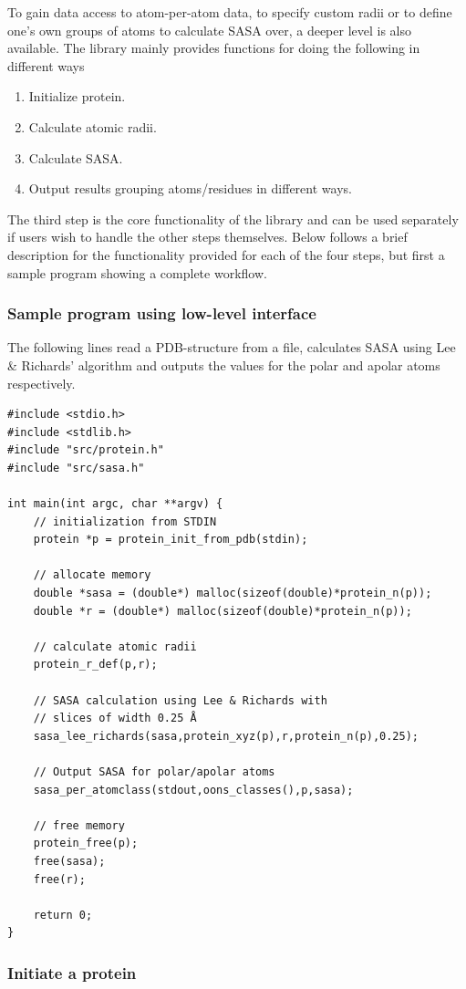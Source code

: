 \documentclass[a4paper,11pt]{article}
\begin{document}
To gain data access to atom-per-atom data, to specify custom radii or
to define one's own groups of atoms to calculate SASA over, a deeper
level is also available. The library mainly provides functions for
doing the following in different ways
\begin{enumerate}
  \item Initialize protein.
  \item Calculate atomic radii.
  \item Calculate SASA.
  \item Output results grouping atoms/residues in different ways.
\end{enumerate}
The third step is the core functionality of the library and can be
used separately if users wish to handle the other steps
themselves. Below follows a brief description for the functionality
provided for each of the four steps, but first a sample program
showing a complete workflow.

\subsubsection{Sample program using low-level interface}
The following lines read a PDB-structure from a file, calculates
SASA using Lee \& Richards' algorithm and outputs the values for the
polar and apolar atoms respectively.
\begin{verbatim}
#include <stdio.h>
#include <stdlib.h>
#include "src/protein.h"
#include "src/sasa.h"

int main(int argc, char **argv) {
    // initialization from STDIN
    protein *p = protein_init_from_pdb(stdin);

    // allocate memory
    double *sasa = (double*) malloc(sizeof(double)*protein_n(p));
    double *r = (double*) malloc(sizeof(double)*protein_n(p));

    // calculate atomic radii
    protein_r_def(p,r);
    
    // SASA calculation using Lee & Richards with 
    // slices of width 0.25 Å
    sasa_lee_richards(sasa,protein_xyz(p),r,protein_n(p),0.25);

    // Output SASA for polar/apolar atoms
    sasa_per_atomclass(stdout,oons_classes(),p,sasa);
   
    // free memory
    protein_free(p);
    free(sasa);
    free(r);

    return 0;
}
\end{verbatim}

\subsubsection{Initiate a protein}
\end{document}
